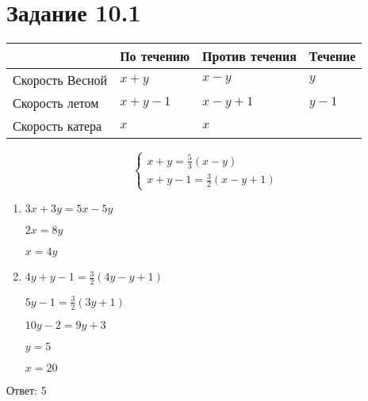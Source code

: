\section*{Задание 10.1}

\begin{tabular}{|l|l|l|l|}
\hline
              & По течению & Против течения & Течение \\ \hline
Скорость Весной & $x+y$        & $x-y$            & $y$     \\ \hline
Скорость летом  & $x+y-1$      & $x-y+1$          & $y-1$     \\ \hline
Скорость катера & $x$          & $x$              &           \\ \hline
\end{tabular}


\[
\begin{cases}
  x+y = \frac{5}{3} (x-y)
  \\
  x+y-1 = \frac{3}{2} (x-y+1)
\end{cases}
\]

\begin{enumerate}
    \item {
    $3x+3y=5x-5y$

    $2x=8y$

    $x=4y$
    }
    
    \item {
    $4y+y-1=\frac{3}{2}(4y-y+1)$
    
    $5y-1=\frac{3}{2}(3y+1)$
    
    $10y-2=9y+3$
    
    $y=5$
    
    $x=20$
    }
\end{enumerate}

Ответ: 5